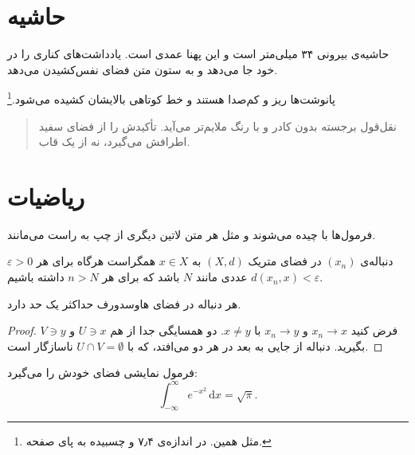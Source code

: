 \section{حاشیه}

حاشیه‌ی بیرونی ۳۴ میلی‌متر است و این پهنا عمدی
است. یادداشت‌های کناری را در خود جا می‌دهد و به ستون متن فضای
نفس‌کشیدن می‌دهد.

\divider

پانوشت‌ها ریز و کم‌صدا هستند و خط کوتاهی بالایشان کشیده می‌شود.\footnote{مثل
همین. در اندازه‌ی ۷٫۴ و چسبیده به پای صفحه.}

\begin{quotation}
نقل‌قول برجسته بدون کادر و با رنگ ملایم‌تر می‌آید. تأکیدش را از فضای سفید
اطرافش می‌گیرد، نه از یک قاب.
\end{quotation}

\section{ریاضیات}

فرمول‌ها با  چیده می‌شوند و مثل هر متن لاتین دیگری از
چپ به راست می‌مانند.

\begin{definition}[همگرایی]
دنباله‌ی $(x_n)$ در فضای متریک $(X, d)$ به $x \in X$ همگراست هرگاه برای هر
$\varepsilon > 0$ عددی مانند $N$ باشد که برای هر $n > N$ داشته باشیم
$d(x_n, x) < \varepsilon$.
\end{definition}

\begin{theorem}[یکتایی حد]
هر دنباله در فضای هاوسدورف حداکثر یک حد دارد.
\end{theorem}

\begin{proof}
فرض کنید $x_n \to x$ و $x_n \to y$ با $x \neq y$. دو همسایگی جدا از هم
$U \ni x$ و $V \ni y$ بگیرید. دنباله از جایی به بعد در هر دو می‌افتد، که با
$U \cap V = \emptyset$ ناسازگار است.
\end{proof}

فرمول نمایشی فضای خودش را می‌گیرد:
\[
  \int_{-\infty}^{\infty} e^{-x^2}\,\mathrm{d}x = \sqrt{\pi}.
\]

